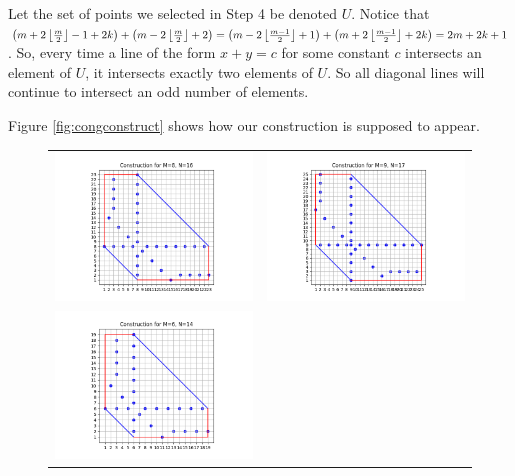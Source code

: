 \documentclass[10pt]{../usamts}
\begin{document}
\begin{solution}
\begin{enumerate}
    Let the set of points we selected in Step 4 be denoted $U$. Notice that $\left(  m+2\left\lfloor \frac{m}{2} \right\rfloor-1+2k \right)+\left( m-2\left\lfloor \frac{m}{2} \right\rfloor+2 \right) = \left( m-2\left\lfloor \frac{m-1}{2} \right\rfloor+1 \right)+\left( m+2\left\lfloor \frac{m-1}{2} \right\rfloor+2k \right) = 2m+2k+1$. So, every time a line of the form $x+y=c$ for some constant $c$ intersects an element of $U$, it intersects exactly two elements of $U$. So all diagonal lines will continue to intersect an odd number of elements.
\end{enumerate}

Figure \ref{fig:congconstruct} shows how our construction is supposed to appear.

\begin{figure}[htbp]
\centering
    \begin{tabular}{c c}
    \includegraphics[width=8cm]{round2/p5construct/construct_8_16.png}&
    \includegraphics[width=8cm]{round2/p5construct/construct_9_17.png}\\
    \includegraphics[width=8cm]{round2/p5construct/construct_6_14.png}&

\end{tabular}
\end{figure}
\end{solution}
\end{document}
